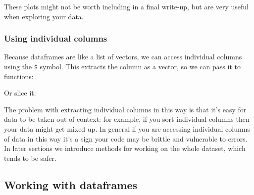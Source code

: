 \documentclass[]{article}
\newenvironment{Shaded}{\begin{snugshade}}{\end{snugshade}}
\newcommand{\KeywordTok}[1]{\textcolor[rgb]{0.13,0.29,0.53}{\textbf{#1}}}
\newcommand{\DecValTok}[1]{\textcolor[rgb]{0.00,0.00,0.81}{#1}}
\newcommand{\StringTok}[1]{\textcolor[rgb]{0.31,0.60,0.02}{#1}}
\newcommand{\OperatorTok}[1]{\textcolor[rgb]{0.81,0.36,0.00}{\textbf{#1}}}
\newcommand{\NormalTok}[1]{#1}
\theoremstyle{definition}
\theoremstyle{definition}
\theoremstyle{definition}
\theoremstyle{remark}
\begin{document}
These plots might not be worth including in a final write-up, but are
very useful when exploring your data.

\subsubsection*{Using individual
columns}\label{using-individual-columns}

Because dataframes are like a list of vectors, we can access individual
columns using the \texttt{\$} symbol. This extracts the column as a
vector, so we can pass it to functions:

\begin{Shaded}
\end{Shaded}

Or slice it:

\begin{Shaded}
\end{Shaded}

{The problem with extracting individual columns in this way is that it's
easy for data to be taken out of context: for example, if you sort
individual columns then your data might get mixed up. In general if you
are accessing individual columns of data in this way it's a sign your
code may be brittle and vulnerable to errors. In later sections we
introduce methods for working on the whole dataset, which tends to be
safer.}

\subsection*{Working with dataframes}\label{working-with-dataframes}
\end{document}
